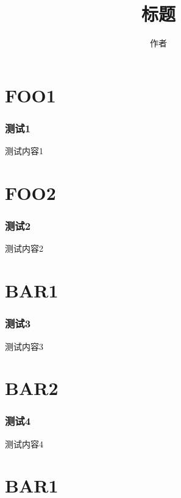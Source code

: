 \documentclass{ctexbeamer}
\begin{document}
    \title{标题}
    \author{作者}
    \maketitle

    

    \section{FOO1}

    \begin{frame}[fragile]
        \frametitle{测试1}
    
        测试内容1
    
    \end{frame}

    \section{FOO2}

    \begin{frame}[fragile]
        \frametitle{测试2}
    
        测试内容2
    
    \end{frame}
    
    

    \section{BAR1}

    \begin{frame}
        \frametitle{测试3}
    
        测试内容3
    
    \end{frame}

    \section{BAR2}

    \begin{frame}
        \frametitle{测试4}

        测试内容4
    \end{frame}

    

    \section{BAR1}
\end{document}
